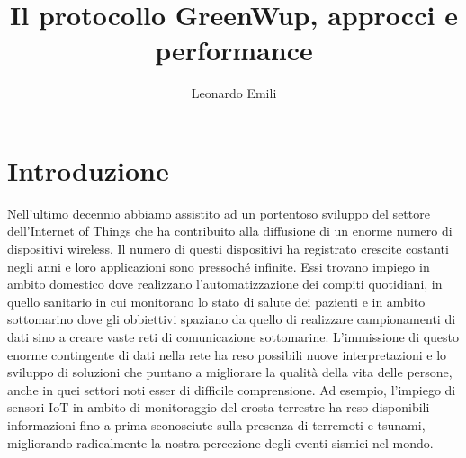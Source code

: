 \documentclass[binding=0.6cm,TFA]{sapthesis}
\title{Il protocollo GreenWup, approcci e performance}
\author{Leonardo Emili}
\begin{document}
\frontmatter
\maketitle

\tableofcontents

\mainmatter
\chapter{Introduzione}


Nell'ultimo decennio abbiamo assistito ad un portentoso sviluppo del settore dell'Internet of Things che ha contribuito alla diffusione
di un enorme numero di dispositivi wireless. Il numero di questi dispositivi ha registrato crescite costanti negli anni e loro applicazioni sono pressoché infinite.
Essi trovano impiego in ambito domestico dove realizzano l'automatizzazione dei compiti quotidiani, in quello sanitario in cui monitorano lo stato di salute
dei pazienti e in ambito sottomarino dove gli obbiettivi spaziano da quello di realizzare campionamenti di dati sino a creare vaste reti di comunicazione sottomarine.
L'immissione di questo enorme contingente di dati nella rete ha reso possibili nuove interpretazioni e lo sviluppo di soluzioni che puntano a
migliorare la qualità della vita delle persone, anche in quei settori noti esser di difficile comprensione. Ad esempio, l'impiego di sensori IoT in ambito di
monitoraggio del crosta terrestre ha reso disponibili informazioni fino a prima sconosciute sulla presenza di terremoti e tsunami, migliorando radicalmente
la nostra percezione degli eventi sismici nel mondo.\\
\end{document}
